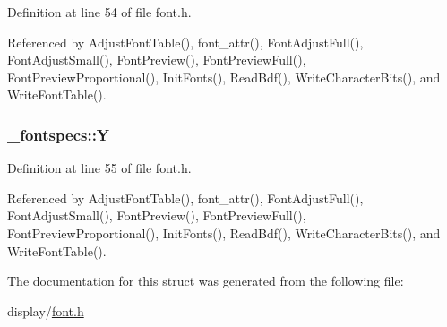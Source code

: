 Definition at line 54 of file font.\-h.



Referenced by Adjust\-Font\-Table(), font\-\_\-attr(), Font\-Adjust\-Full(), Font\-Adjust\-Small(), Font\-Preview(), Font\-Preview\-Full(), Font\-Preview\-Proportional(), Init\-Fonts(), Read\-Bdf(), Write\-Character\-Bits(), and Write\-Font\-Table().

\hypertarget{struct__fontspecs_a9771541eab33755d22c804f3bedf8682}{
\subsubsection[{Y}]{ \-\_\-fontspecs\-::\-Y}}\label{struct__fontspecs_a9771541eab33755d22c804f3bedf8682}


Definition at line 55 of file font.\-h.



Referenced by Adjust\-Font\-Table(), font\-\_\-attr(), Font\-Adjust\-Full(), Font\-Adjust\-Small(), Font\-Preview(), Font\-Preview\-Full(), Font\-Preview\-Proportional(), Init\-Fonts(), Read\-Bdf(), Write\-Character\-Bits(), and Write\-Font\-Table().



The documentation for this struct was generated from the following file\-:\begin{DoxyCompactItemize}
\item 
display/\hyperlink{display_2font_8h}{font.\-h}\end{DoxyCompactItemize}
